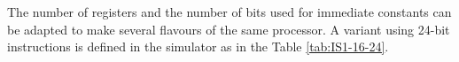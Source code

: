 \documentclass[10pt,a4paper]{article}
\theoremstyle{definition}%
\begin{document}

The number of registers and the number of bits used for immediate constants can be adapted to make several flavours of the same processor. A variant using 24-bit instructions is defined in the simulator as in the Table \vref{tab:IS1-16-24}.

\begin{table}[ht!]
	\begin{center}

\end{center}
\end{table}
\end{document}
